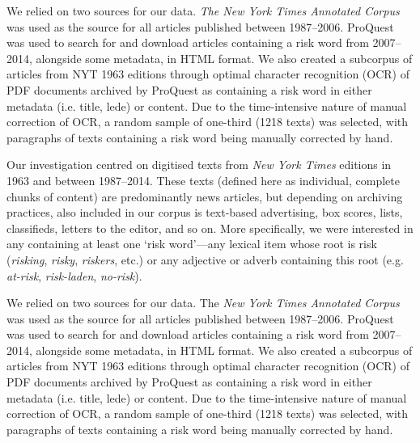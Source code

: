 We relied on two sources for our data. \emph{The New York Times Annotated Corpus} was used as the source for all articles published between 1987--2006. ProQuest was used to search for and download articles containing a risk word from 2007--2014, alongside some metadata, in HTML format. We also created a subcorpus of articles from NYT 1963 editions through optimal character recognition (OCR) of PDF documents archived by ProQuest as containing a risk word in either metadata (i.e. title, lede) or content. Due to the time-intensive nature of manual correction of OCR, a random sample of one-third (1218 texts) was selected, with paragraphs of texts containing a risk word being manually corrected by hand.














    Our investigation centred on digitised texts from \emph{New York Times} editions in 1963 and between 1987--2014. These texts (defined here as individual, complete chunks of content) are predominantly news articles, but depending on archiving practices, also included in our corpus is text-based advertising, box scores, lists, classifieds, letters to the editor, and so on. More specifically, we were interested in any  containing at least one `risk word'---any lexical item whose root is risk (\emph{risking}, \emph{risky}, \emph{riskers}, etc.) or any adjective or adverb containing this root (e.g. \emph{at-risk}, \emph{risk-laden}, \emph{no-risk}).~

    We relied on two sources for our data. The \emph{New York Times Annotated Corpus} \cite{sandhaus_new_2008} was used as the source for all articles published between 1987--2006. ProQuest was used to search for and download articles containing a risk word from 2007--2014, alongside some metadata, in HTML format. We also created a subcorpus of articles from NYT 1963 editions through optimal character recognition (OCR) of PDF documents archived by ProQuest as containing a risk word in either metadata (i.e. title, lede) or content. Due to the time-intensive nature of manual correction of OCR, a random sample of one-third (1218 texts) was selected, with paragraphs of texts containing a risk word being manually corrected by hand.

